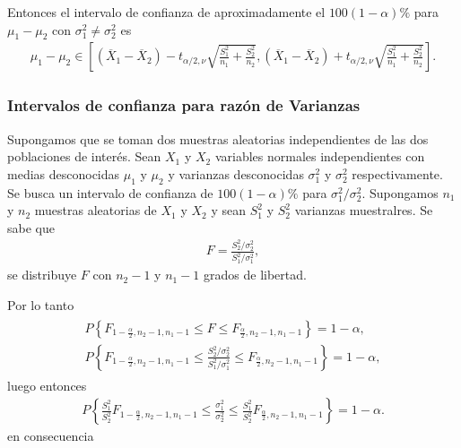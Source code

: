 \documentclass[a4paper]{report} %
\begin{document}
Entonces el intervalo de confianza de aproximadamente el $100\left(1-\alpha\right)\%$ para $\mu_{1}-\mu_{2}$ con $\sigma_{1}^{2}\neq\sigma_{2}^{2}$ es
\begin{eqnarray}
\mu_{1}-\mu_{2}\in\left[\left(\overline{X}_{1}-\overline{X}_{2}\right)-t_{\alpha/2,\nu}\sqrt{\frac{S_{1}^{2}}{n_{1}}+\frac{S_{2}^{2}}{n_{2}}},\left(\overline{X}_{1}-\overline{X}_{2}\right)+t_{\alpha/2,\nu}\sqrt{\frac{S_{1}^{2}}{n_{1}}+\frac{S_{2}^{2}}{n_{2}}}\right].
\end{eqnarray}

\subsubsection{Intervalos de confianza para raz\'on de Varianzas}

Supongamos que se toman dos muestras aleatorias independientes de las dos poblaciones de inter\'es. Sean $X_{1}$ y $X_{2}$ variables normales independientes con medias desconocidas $\mu_{1}$ y $\mu_{2}$ y varianzas desconocidas $\sigma_{1}^{2}$ y $\sigma_{2}^{2}$ respectivamente. Se busca un intervalo de confianza de $100\left(1-\alpha\right)\%$ para $\sigma_{1}^{2}/\sigma_{2}^{2}$. Supongamos $n_{1}$ y $n_{2}$ muestras aleatorias de $X_{1}$ y $X_{2}$ y sean $S_{1}^{2}$ y $S_{2}^{2}$ varianzas muestralres. Se sabe que 
\begin{eqnarray}F=\frac{S_{2}^{2}/\sigma_{2}^{2}}{S_{1}^{2}/\sigma_{1}^{2}},\end{eqnarray}
se distribuye $F$ con $n_{2}-1$ y $n_{1}-1$ grados de libertad.


Por lo tanto
\begin{eqnarray}
\begin{array}{l}
P\left\{F_{1-\frac{\alpha}{2},n_{2}-1,n_{1}-1}\leq F\leq F_{\frac{\alpha}{2},n_{2}-1,n_{1}-1}\right\}=1-\alpha,\\
P\left\{F_{1-\frac{\alpha}{2},n_{2}-1,n_{1}-1}\leq \frac{S_{2}^{2}/\sigma_{2}^{2}}{S_{1}^{2}/\sigma_{1}^{2}}\leq F_{\frac{\alpha}{2},n_{2}-1,n_{1}-1}\right\}=1-\alpha,
\end{array}
\end{eqnarray}
luego entonces
\begin{eqnarray}
P\left\{\frac{S_{1}^{2}}{S_{2}^{2}}F_{1-\frac{\alpha}{2},n_{2}-1,n_{1}-1}\leq \frac{\sigma_{1}^{2}}{\sigma_{2}^{2}}\leq \frac{S_{1}^{2}}{S_{2}^{2}}F_{\frac{\alpha}{2},n_{2}-1,n_{1}-1}\right\}=1-\alpha.
\end{eqnarray}
en consecuencia
\end{document}
